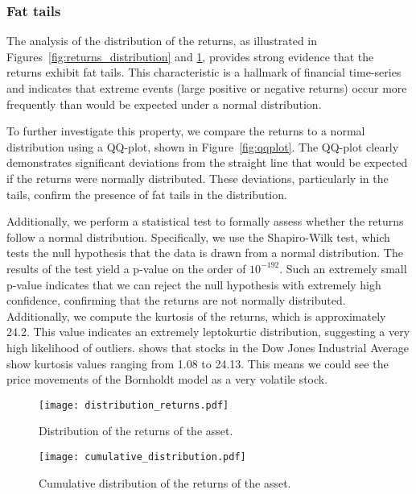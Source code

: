 \subsubsection{Fat tails}
The analysis of the distribution of the returns, as illustrated in Figures~\ref{fig:returns_distribution} and \ref{fig:cumulative_returns_distribution}, provides strong evidence that the returns exhibit fat tails. This characteristic is a hallmark of financial time-series and indicates that extreme events (large positive or negative returns) occur more frequently than would be expected under a normal distribution.

To further investigate this property, we compare the returns to a normal distribution using a QQ-plot, shown in Figure~\ref{fig:qqplot}. The QQ-plot clearly demonstrates significant deviations from the straight line that would be expected if the returns were normally distributed. These deviations, particularly in the tails, confirm the presence of fat tails in the distribution.

Additionally, we perform a statistical test to formally assess whether the returns follow a normal distribution. Specifically, we use the Shapiro-Wilk test, which tests the null hypothesis that the data is drawn from a normal distribution. The results of the test yield a p-value on the order of $10^{-192}$. Such an extremely small p-value indicates that we can reject the null hypothesis with extremely high confidence, confirming that the returns are not normally distributed. Additionally, we compute the kurtosis of the returns, which is approximately 24.2. This value indicates an extremely leptokurtic distribution, suggesting a very high likelihood of outliers. \cite{kurtosis_skewness} shows that stocks in the Dow Jones Industrial Average show kurtosis values ranging from 1.08 to 24.13. This means we could see the price movements of the Bornholdt model as a very volatile stock.

\begin{figure}[H]
    \centering
    \begin{minipage}[T]{0.45\textwidth}
        \centering
        \texttt{[image: distribution\_returns.pdf]}
        \caption{Distribution of the returns of the asset.}
        \label{fig:returns_distribution}
    \end{minipage}
    \hfill
    \begin{minipage}[T]{0.45\textwidth}
        \centering
        \texttt{[image: cumulative\_distribution.pdf]}
        \caption{Cumulative distribution of the returns of the asset.}
        \label{fig:cumulative_returns_distribution}
    \end{minipage}
\end{figure}



